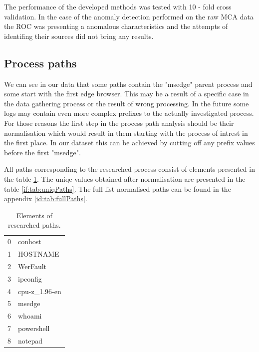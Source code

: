 \documentclass[a4paper,twoside,12pt]{book}
\begin{document}
The performance of the developed methods was tested with 10 - fold cross validation. In the case of
the anomaly detection performed on the raw MCA data the ROC was presenting a anomalous characteristics 
and the attempts of identifing their sources did not bring any results.

\subsection{Process paths}

We can see in our data that some paths contain the "msedge" parent process and some start with the first 
edge browser. This may be a result of a specific case in the data gathering process or the result of wrong 
processing. In the future some logs may contain even more complex prefixes to the actually investigated
process. For those reasons the first step in the process path analysis should be their normalisation which
would result in them starting with the process of intrest in the first place. In our dataset this can 
be achieved by cutting off any prefix values before the first "msedge".  

All paths corresponding to the researched process consist of elements presented in the table 
\ref{id:tab:pathElems}. The uniqe values obtained after normalisation are presented in the table 
\ref{if:tab:uniqPaths}. The full list normalised paths can be found in the appendix \ref{id:tab:fullPaths}.

\begin{table}
\centering
\caption{Elements of researched paths.}
\label{id:tab:pathElems}
\begin{tabular}{ll}
	\toprule
	0 &        conhost \\
	1 &       HOSTNAME \\
	2 &       WerFault \\
	3 &       ipconfig \\
	4 &  cpu-z\_1.96-en \\
	5 &         msedge \\
	6 &         whoami \\
	7 &     powershell \\
	8 &        notepad \\
	\bottomrule
\end{tabular}
\end{table}		
	
\end{document}
